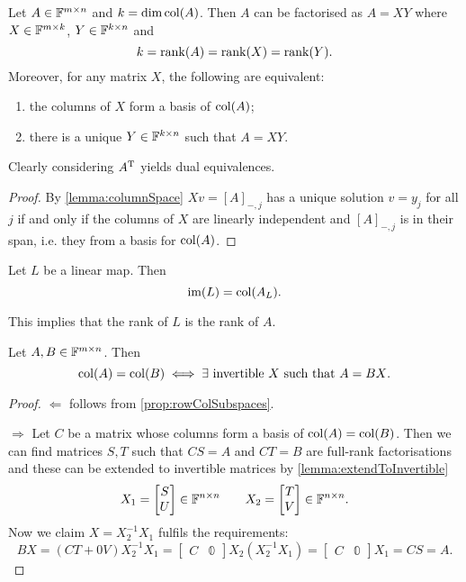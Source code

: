 \begin{lemma}
Let $A\in\mathbb{F}^{m\times n}$ and $k=\dim\operatorname{col}(A)$. Then $A$ can be factorised as $A=XY$ where $X\in\mathbb{F}^{m\times k}$, $Y\in\mathbb{F}^{k\times n}$ and
\[ k = \operatorname{rank}(A) = \operatorname{rank}(X) = \operatorname{rank}(Y). \]
Moreover, for any matrix $X$, the following are equivalent:
\begin{enumerate}
\item the columns of $X$ form a basis of $\operatorname{col}(A)$;
\item there is a unique $Y\in\mathbb{F}^{k\times n}$ such that $A=XY$.
\end{enumerate}
Clearly considering $A^{\mathrm{T}}$ yields dual equivalences.
\end{lemma}
\begin{proof}
By \ref{lemma:columnSpace} $Xv = [A]_{-,j}$ has a unique solution $v=y_j$ for all $j$ if and only if the columns of $X$ are linearly independent and $[A]_{-,j}$ is in their span, i.e. they from a basis for $\operatorname{col}(A)$.
\end{proof}

\begin{proposition} \label{lemma:imageColumnSpace}
Let $L$ be a linear map. Then
\[ \operatorname{im}(L) = \operatorname{col}(A_L). \]
\end{proposition}
This implies that the rank of $L$ is the rank of $A$.

\begin{proposition}
Let $A,B\in\mathbb{F}^{m\times n}$. Then
\[ \operatorname{col}(A)=\operatorname{col}(B) \iff \text{$\exists$ invertible $X$ such that $A = BX$}. \]
\end{proposition}
\begin{proof}
$\boxed{\Leftarrow}$ follows from \ref{prop:rowColSubspaces}.

$\boxed{\Rightarrow}$ Let $C$ be a matrix whose columns form a basis of $\operatorname{col}(A)=\operatorname{col}(B)$. Then we can find matrices $S,T$ such that $CS = A$ and $CT = B$ are full-rank factorisations and these can be extended to invertible matrices by \ref{lemma:extendToInvertible}
\[ X_1 = \begin{bmatrix}
S \\ U
\end{bmatrix} \in \mathbb{F}^{n\times n} \qquad X_2 = \begin{bmatrix}
T \\ V
\end{bmatrix} \in \mathbb{F}^{n\times n}. \]
Now we claim $X = X_2^{-1}X_1$ fulfils the requirements:
\[ BX = (CT + 0V)X_2^{-1}X_1 = \begin{bmatrix}
C & \mathbb{0}
\end{bmatrix}X_2(X_2^{-1}X_1) = \begin{bmatrix}
C & \mathbb{0}
\end{bmatrix}X_1 = CS = A. \]
\end{proof}

